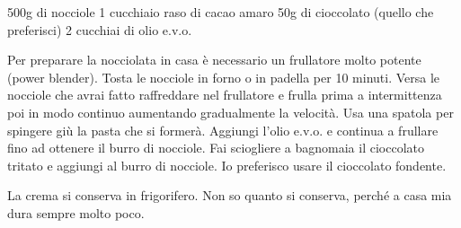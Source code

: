 \serves{-}%
\begin{ingreds}
	500g di nocciole
	1 cucchiaio raso di cacao amaro
	50g di cioccolato (quello che preferisci)
	2 cucchiai di olio e.v.o.


\end{ingreds}

\begin{method}
	Per preparare la nocciolata in casa è necessario un frullatore molto potente (power blender). Tosta le nocciole in forno o in padella per 10 minuti. Versa le nocciole che avrai fatto raffreddare nel frullatore e frulla prima a intermittenza poi in modo continuo aumentando gradualmente la velocità. Usa una spatola per spingere giù la pasta che si formerà. Aggiungi l'olio e.v.o. e continua a frullare fino ad ottenere il burro di nocciole. Fai sciogliere a bagnomaia il cioccolato tritato e aggiungi al burro di nocciole. Io preferisco usare il cioccolato fondente.

	La crema si conserva in frigorifero. Non so quanto si conserva, perché a casa mia dura sempre molto poco.


\end{method}




